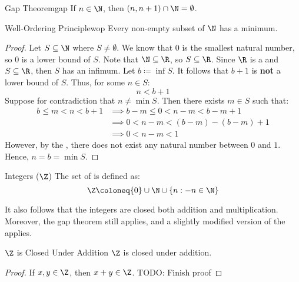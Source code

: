 \documentclass[letterpaper,12pt]{report}
\begin{document}
\iffalse
\begin{thmbox}{Corollary 3.1.3}{}
	\textbf{Corollary}: If $E \subseteq \N$ and $E$ is supernatural, then $E = \N$.
	\tcblower
	\begin{proof}
		Let $E \subseteq \N$. $\N \subseteq E$ by Lemma 3.1.2, so $E = \N$.
	\end{proof}
\end{thmbox}
\fi

\begin{thmbox}{Gap Theorem}{gap}
	If $n \in \N$, then $(n, n+1) \cap \N = \emptyset$.
\end{thmbox}

\begin{thmbox}{Well-Ordering Principle}{wop}
	Every non-empty subset of $\N$ has a minimum.
	\tcblower
	\begin{proof}
		Let $S \subseteq \N$ where $S \neq \emptyset$. We know that $0$ is the smallest natural number, so $0$ is a lower bound of $S$. Note that $\N \subseteq \R$, so $S \subseteq \R$. Since $\R$ is a  and $S \subseteq \R$, then $S$ has an infimum. Let $b \coloneq \inf S$. It follows that $b+1$ is \textbf{not} a lower bound of $S$. Thus, for some $n \in S$:
		\[ n < b + 1 \]
		Suppose for contradiction that $n \neq \min S$. Then there exists $m \in S$ such that:
		\begin{align*}
			b \leq m < n < b+1
			&\implies b-m \leq 0 < n-m < b-m+1 \\
			&\implies 0 < n-m < (b-m) - (b-m) + 1 \\
			&\implies 0 < n-m < 1
		\end{align*}
		However, by the , there does not exist any natural number between $0$ and $1$. Hence, $n = b = \min S$.
	\end{proof}
\end{thmbox}

\begin{dfnbox}{Integers ($\Z$)}{}
	The set of  is defined as:
	\[ \Z \coloneq \{0\} \cup \N \cup \{n : -n \in \N\} \]
\end{dfnbox}

It also follows that the integers are closed both addition and multiplication. Moreover, the gap theorem still applies, and a slightly modified version of the  applies.

\begin{thmbox}{$\Z$ is Closed Under Addition}{}
	$\Z$ is closed under addition.
	\tcblower
	\begin{proof}
		If $x,y \in \Z$, then $x+y \in \Z$. TODO: Finish proof
	\end{proof}
\end{thmbox}
\end{document}
